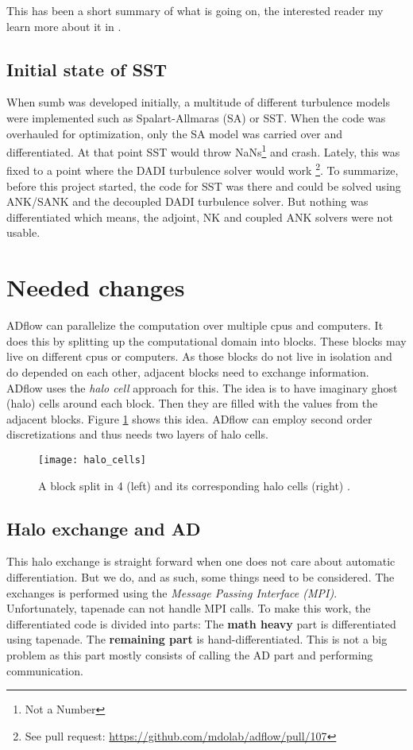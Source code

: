 This has been a short summary of what is going on, the interested reader my
learn more about it in \cite{cm1}.




\subsection{Initial state of SST}
When sumb was developed initially, a multitude of different turbulence models
were implemented such as Spalart-Allmaras (SA) or SST. When the code was
overhauled for optimization, only the SA model was carried over and
differentiated. At that point SST would throw NaNs\footnote{Not a Number} and
crash. Lately, this was fixed to a point where the DADI turbulence solver would
work \footnote{See pull request:
\url{https://github.com/mdolab/adflow/pull/107}}. To summarize, before this
project started, the code for SST was there and could be solved using ANK/SANK
and the decoupled DADI turbulence solver. But nothing was differentiated which
means, the adjoint, NK and coupled ANK solvers were not usable.








\section{Needed changes}
ADflow can parallelize the computation over multiple cpus and computers. It
does this by splitting up the computational domain into blocks. These blocks
may live on different cpus or computers. As those blocks do not live in
isolation and do depended on each other, adjacent blocks need to exchange
information. ADflow uses the \textit{halo cell} approach for this. The idea is
to have imaginary ghost (halo) cells around each block. Then they are filled
with the values from the adjacent blocks. Figure \ref{fig:halo_cells} shows
this idea. ADflow can employ second order discretizations and thus needs two
layers of halo cells.

\begin{figure}[H] \centering
\texttt{[image: halo\_cells]}
    \caption{A block split in 4 (left) and its corresponding halo cells (right)
            \cite{cfd_halo}.}
    \label{fig:halo_cells}
\end{figure}




\subsection{Halo exchange and AD}
This halo exchange is straight forward when one does not care about automatic
differentiation. But we do, and as such, some things need to be considered. The
exchanges is performed using the \textit{Message Passing Interface (MPI)}.
Unfortunately, tapenade can not handle MPI calls. To make this work, the
differentiated code is divided into parts: The \textbf{math heavy} part is
differentiated using tapenade. The \textbf{remaining part} is
hand-differentiated. This is not a big problem as this part mostly consists of
calling the AD part and performing communication. 

